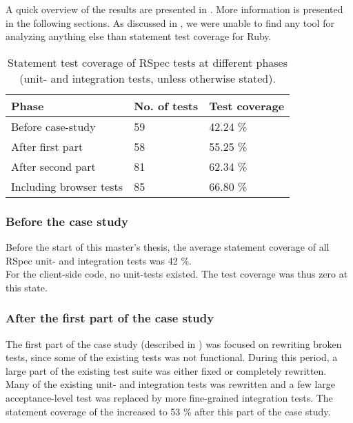 \label{sec:results_coverage}

A quick overview of the results are presented in
. More information is presented in the following
sections. As discussed in , we were unable
to find any tool for analyzing anything else than statement test
coverage for Ruby.\\

\begin{table}[t]
    \centering
    \begin{tabular}{l l l}
        Phase & No. of tests & Test coverage\\
        \hline
        Before case-study &       59 & 42.24 \%\\
        After first part  &       58 & 55.25 \%\\
        After second part &       81 & 62.34 \%\\
        Including browser tests & 85 & 66.80 \%\\
    \end{tabular}
    \caption{ Statement test coverage of RSpec tests at different phases (unit- and integration tests, unless otherwise stated). }
    \label{tab:unit_coverage}
\end{table}

\subsubsection{Before the case study}

Before the start of this master's thesis, the average statement coverage
of all RSpec unit- and integration tests was 42 \%.\\

For the client-side code, no unit-tests existed. The test coverage was
thus zero at this state.\\


\subsubsection{After the first part of the case study}

The first part of the case study (described in )
was focused on rewriting broken tests, since some of the existing tests
was not functional. During this period, a large part of the existing
test suite was either fixed or completely rewritten. Many of the
existing unit- and integration tests was rewritten and a few large
acceptance-level test was replaced by more fine-grained integration
tests. The statement coverage of the increased to 53 \% after this
part of the case study.\\

